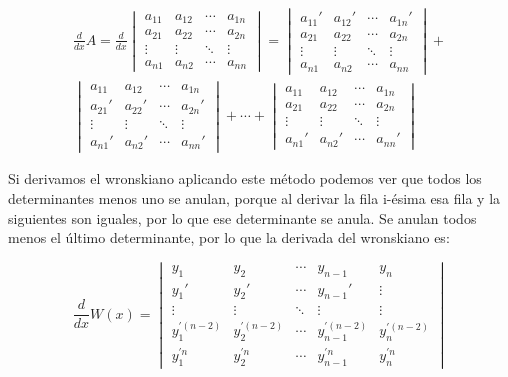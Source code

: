 \documentclass[a4paper,12pt,titlepage]{article}
\begin{document}
\begin{equation}
    \begin{gathered}
        \frac{d}{dx} A = \frac{d}{dx} \begin{vmatrix}
            a_{11} & a_{12} & \cdots & a_{1n} \\
            a_{21} & a_{22} & \cdots & a_{2n} \\
            \vdots & \vdots & \ddots & \vdots \\
            a_{n1} & a_{n2} & \cdots & a_{nn}
        \end{vmatrix} = 
        \begin{vmatrix}
            a_{11}' & a_{12}' & \cdots & a_{1n}' \\
            a_{21} & a_{22} & \cdots & a_{2n} \\
            \vdots & \vdots & \ddots & \vdots \\
            a_{n1} & a_{n2} & \cdots & a_{nn}
        \end{vmatrix} + 
        \\
        \begin{vmatrix}
            a_{11} & a_{12} & \cdots & a_{1n} \\
            a_{21}' & a_{22}' & \cdots & a_{2n}' \\
            \vdots & \vdots & \ddots & \vdots \\
            a_{n1}' & a_{n2}' & \cdots & a_{nn}'
        \end{vmatrix} + \cdots + 
        \begin{vmatrix}
            a_{11} & a_{12} & \cdots & a_{1n} \\
            a_{21} & a_{22} & \cdots & a_{2n} \\
            \vdots & \vdots & \ddots & \vdots \\
            a_{n1}' & a_{n2}' & \cdots & a_{nn}'
        \end{vmatrix}
    \end{gathered}
\end{equation}

Si derivamos el wronskiano aplicando este método podemos ver que todos los determinantes menos uno se anulan, porque al derivar la fila i-ésima esa fila y la siguientes son iguales, por lo que ese determinante se anula. Se anulan todos menos el último determinante, por lo que la derivada del wronskiano es:

\begin{equation}
    \frac{d}{dx} W(x) =
        \begin{vmatrix}
            y_1 & y_2 & \cdots & y_{n-1} & y_n \\
            y_1' & y_2' & \cdots & y_{n-1}' & \vdots \\
            \vdots & \vdots & \ddots & \vdots & \vdots \\
            y_1^{'(n-2)} & y_2^{'(n-2)} & \cdots & y_{n-1}^{'(n-2)} & y_n^{'(n-2)} \\
            y_1^{'n} & y_2^{'n} & \cdots & y_{n-1}^{'n} & y_n^{'n}
        \end{vmatrix}
\end{equation}
\end{document}
